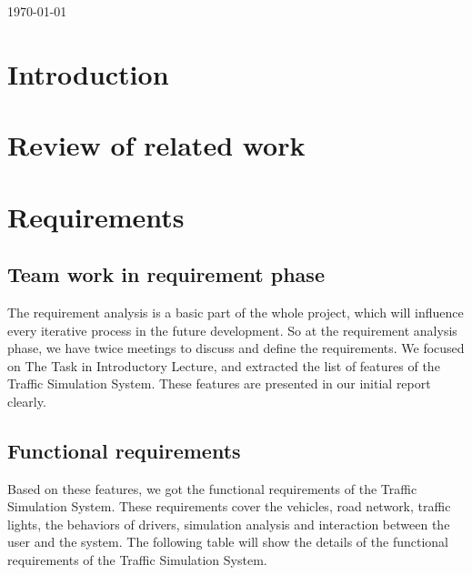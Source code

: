 \documentclass[a4paper,12pt]{article}
\begin{document}
\begin{titlepage}
{\large \today}\\[3cm] %


 

\vfill %

\end{titlepage}


\tableofcontents

\section{Introduction}

\section{Review of related work}

\section{Requirements}
\subsection{Team work in requirement phase} The requirement analysis is a basic part of the whole project, which will influence every iterative process in the future development. So at the requirement analysis phase, we have twice meetings to discuss and define the requirements. We focused on The Task in Introductory Lecture, and extracted the list of features of the Traffic Simulation System. These features are presented in our initial report clearly.
\subsection{Functional requirements}  Based on these features, we got the functional requirements of the Traffic Simulation System. These requirements cover the vehicles, road network, traffic lights, the behaviors of drivers, simulation analysis and interaction between the user and the system. The following table will show the details of the functional requirements of the Traffic Simulation System.
\end{document}

